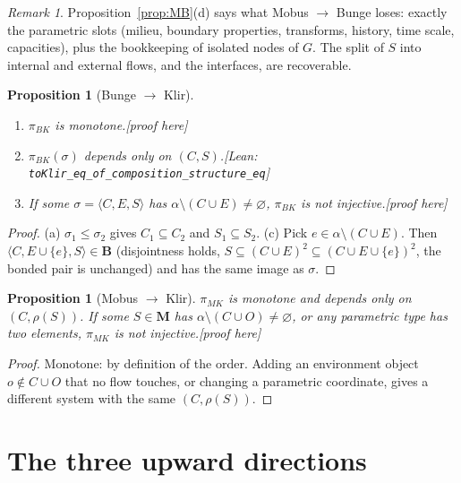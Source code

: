 \documentclass[11pt]{article}
\newtheorem{proposition}[theorem]{Proposition}
\theoremstyle{definition}
\theoremstyle{remark}
\newtheorem{remark}[theorem]{Remark}
\newcommand{\B}{\mathbf{B}}
\newcommand{\M}{\mathbf{M}}
\newcommand{\lean}[1]{\texttt{#1}}
\newcommand{\status}[1]{\hfill\textsf{\small[#1]}}
\newcommand{\pBK}{\pi_{BK}}
\newcommand{\pMK}{\pi_{MK}}
\begin{document}
\begin{remark}
Proposition~\ref{prop:MB}(d) says what Mobus $\to$ Bunge loses: exactly the parametric slots (milieu, boundary properties, transforms, history, time scale, capacities), plus the bookkeeping of isolated nodes of $G$. The split of $S$ into internal and external flows, and the interfaces, are recoverable.
\end{remark}

\begin{proposition}[Bunge $\to$ Klir]\label{prop:BK}\leavevmode
\begin{enumerate}[label=(\alph*),nosep]
\item $\pBK$ is monotone.\status{proof here}
\item $\pBK(\sigma)$ depends only on $(C,S)$.\status{Lean: \lean{toKlir\_eq\_of\_composition\_structure\_eq}}
\item If some $\sigma=\langle C,E,S\rangle$ has $\alpha\setminus(C\cup E)\neq\varnothing$, $\pBK$ is not injective.\status{proof here}
\end{enumerate}
\end{proposition}
\begin{proof}
(a) $\sigma_1\le\sigma_2$ gives $C_1\subseteq C_2$ and $S_1\subseteq S_2$. (c) Pick $e\in\alpha\setminus(C\cup E)$. Then $\langle C,E\cup\{e\},S\rangle\in\B$ (disjointness holds, $S\subseteq(C\cup E)^2\subseteq(C\cup E\cup\{e\})^2$, the bonded pair is unchanged) and has the same image as $\sigma$.
\end{proof}

\begin{proposition}[Mobus $\to$ Klir]\label{prop:MK}
$\pMK$ is monotone and depends only on $(C,\rho(S))$. If some $S\in\M$ has $\alpha\setminus(C\cup O)\ne\varnothing$, or any parametric type has two elements, $\pMK$ is not injective.\status{proof here}
\end{proposition}
\begin{proof}
Monotone: by definition of the order. Adding an environment object $o\notin C\cup O$ that no flow touches, or changing a parametric coordinate, gives a different system with the same $(C,\rho(S))$.
\end{proof}

\section{The three upward directions}\label{sec:up}
\end{document}
